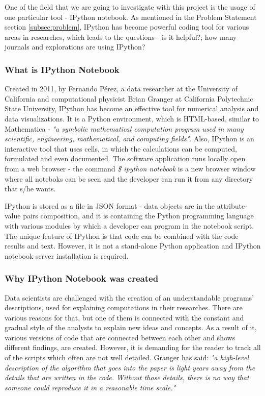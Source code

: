 
One of the field that we are going to investigate with this project is the usage of one particular tool - IPython notebook. As mentioned in the Problem Statement section \ref{subsec:problem}, IPython has become powerful coding tool for various areas in researches, which leads to the questions - is it helpful?; how many journals and explorations are using IPython? 

\subsubsection{What is IPython Notebook}

Created in 2011, by Fernando Pérez, a data researcher at the University of California and computational physicist Brian Granger at California Polytechnic State University, IPython has become an effective tool for numerical analysis and data visualizations.\cite{shen2014interactive} It is a Python environment, which is HTML-based, similar to Mathematica - \textit{"a symbolic mathematical computation program used in many scientific, engineering, mathematical, and computing fields"}. \cite{mathematicaWiki} \cite{mathematicaWolfram} Also, IPython is an interactive tool that uses cells, in which the calculations can be computed, formulated and even documented. The software application runs locally open from a web browser - the command \textit{\$ ipython notebook} is a new browser window where all noteboks can be seen and the developer can run it from any directory that s/he wants.  \cite{johansson2014introduction}

IPython is stored as a file in JSON format - data objects are in the attribute-value pairs composition, and it is containing the Python programming language with various modules by which a developer can program in the notebook script. The unique feature of IPython is that code can be combined with the code results and text. However, it is not a stand-alone Python application and IPython notebook server installation is required.

\subsubsection{Why IPython Notebook was created}

Data scientists are challenged with the creation of an understandable programs' descriptions, used for explaining computations in their researches. There are various reasons for that, but one of them is connected with the constant and gradual style of the analysts to explain new ideas and concepts. As a result of it, various versions of code that are connected between each other and shows different findings, are created. However, it is demanding for the reader to track all of the scripts which often are not well detailed. Granger has said: \textit{"a high-level description of the algorithm that goes into the paper is light years away from
the details that are written in the code. Without those details, there is no way that someone could reproduce it in a reasonable time scale."} \cite{shen2014interactive}


